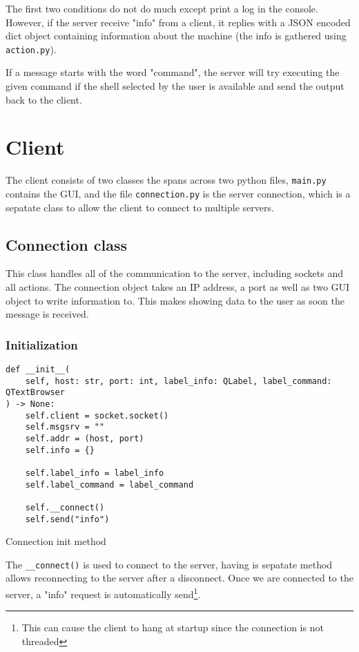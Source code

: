 \documentclass{article}
\begin{document}
The first two conditions do not do much except print a log in the console.
However, if the server receive "info" from a client, it replies with a JSON
encoded dict object containing information about the machine (the info is
gathered using \verb|action.py|). 

If a message starts with the word "command", the server will try executing the
given command if the shell selected by the user is available and send the output
back to the client.
\section{Client}
The client consists of two classes the spans across two python files,
\verb|main.py| contains the GUI, and the file \verb |connection.py| is the
server connection, which is a sepatate class to allow the client to connect to
multiple servers.

\subsection{Connection class}
This class handles all of the communication to the server, including sockets and
all actions. The connection object takes an IP address, a port as well as two
GUI object to write information to. This makes showing data to the user as soon
the message is received.

\subsubsection{Initialization}
\begin{listing}[H]
    \begin{verbatim}
def __init__(
    self, host: str, port: int, label_info: QLabel, label_command: QTextBrowser
) -> None:
    self.client = socket.socket()
    self.msgsrv = ""
    self.addr = (host, port)
    self.info = {}

    self.label_info = label_info
    self.label_command = label_command

    self.__connect()
    self.send("info")
    \end{verbatim}
    \caption{Connection init method}
    \label{client:init}
\end{listing}

The \verb|__connect()| is used to connect to the server, having is sepatate
method allows reconnecting to the server after a disconnect. Once we are
connected to the server, a "info" request is automatically send\footnote{This
can cause the client to hang at startup since the connection is not threaded}. 
\end{document}
